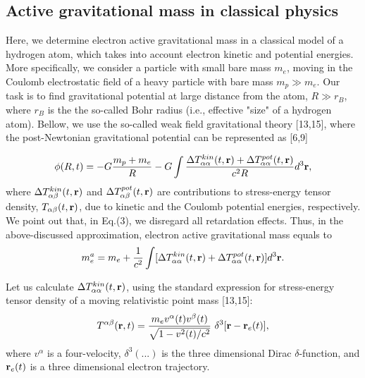 \documentclass{ws-ijmpd}
\begin{document}
\subsection{Active gravitational mass in classical physics}
Here, we determine electron active gravitational mass in a
classical model of a hydrogen atom, which takes into account
electron kinetic and potential energies. More specifically, we
consider a particle with small bare mass $m_e$, moving in the
Coulomb electrostatic field of a heavy particle with bare mass
$m_p \gg m_e$. Our task is to find gravitational potential at large
distance from the atom, $R \gg r_B$, where $r_B$ is the the
so-called Bohr radius (i.e., effective "size" of a hydrogen atom).
Bellow, we use the so-called weak field gravitational theory
[13,15], where the post-Newtonian gravitational potential can be
represented as [6,9]

\begin{equation}
\phi(R,t)=-G \frac{m_p + m_e}{R}- G \int \frac{\Delta
T^{kin}_{\alpha \alpha}(t,{\bf r})+
 \Delta T^{pot}_{\alpha
\alpha}(t,{\bf r})}{c^2R} d^3 {\bf r} ,
\end{equation}
where $\Delta T^{kin}_{\alpha \beta}(t,{\bf r})$ and $\Delta
T^{pot}_{\alpha \beta}(t,{\bf r})$ are contributions to
stress-energy tensor density, $T_{\alpha \beta}(t, {\bf r})$, due
to kinetic and the Coulomb potential energies, respectively. We
point out that, in Eq.(3), we disregard all retardation effects.
Thus, in the above-discussed approximation, electron active
gravitational mass equals to
\begin{equation}
m^a_e = m_e + \frac{1}{c^2} \int [\Delta T^{kin}_{\alpha
\alpha}(t,{\bf r}) + \Delta T^{pot}_{\alpha \alpha}(t,{\bf r})]
d^3{\bf r}.
\end{equation}

Let us calculate $\Delta T^{kin}_{\alpha \alpha}(t, {\bf r})$,
using the standard expression for stress-energy tensor density of
a moving relativistic point mass [13,15]:
\begin{equation}
T^{\alpha \beta}({\bf r},t) = \frac{m_e v^{\alpha}(t)
v^{\beta}(t)}{\sqrt{1-v^2(t)/c^2}} \ \delta^3[{\bf r}-{\bf
r}_e(t)],
\end{equation}
where $v^{\alpha}$ is a four-velocity, $\delta^3(...)$ is the
three dimensional Dirac $\delta$-function, and ${\bf r}_e(t)$ is a
three dimensional electron trajectory.
\end{document}
